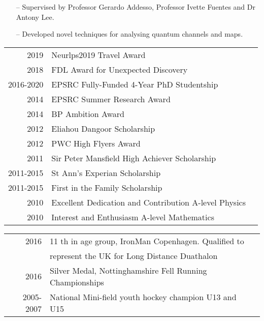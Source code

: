 \documentclass[10pt,a4paper]{altacv}
\begin{document}

\begin{itemize}
    \setlength{\itemindent}{0.5em}
    \item[--]   \small{Supervised by Professor Gerardo Addesso, Professor Ivette Fuentes and Dr Antony Lee.}
    \item[--]   \small{Developed novel techniques for analysing quantum channels and maps.}
\end{itemize}

\medskip





\begin{tabular}{rll}
   2019 & Neurlps2019 Travel Award \\
   2018 & FDL Award for Unexpected Discovery \\
   2016-2020 & EPSRC Fully-Funded 4-Year PhD Studentship \\
   2014 & EPSRC Summer Research Award \\
   2014 & BP Ambition Award \\
   2012 & Eliahou Dangoor Scholarship \\
   2012 & PWC High Flyers Award \\
   2011 & Sir Peter Mansfield High Achiever Scholarship \\
   2011-2015 & St Ann's Experian Scholarship \\
   2011-2015 & First in the Family Scholarship \\
   2010 & Excellent Dedication and Contribution A-level Physics \\
   2010 & Interest and Enthusiasm A-level Mathematics

\end{tabular}

\divider

%



\begin{tabular}{rll}
2016 & 11 th in age group, IronMan Copenhagen. Qualified to \\
& represent the UK for Long Distance Duathalon  \\
2016 & Silver Medal, Nottinghamshire Fell Running Championships  \\
2005-2007 & National Mini-field youth hockey champion U13 and U15
\end{tabular}
\end{document}
